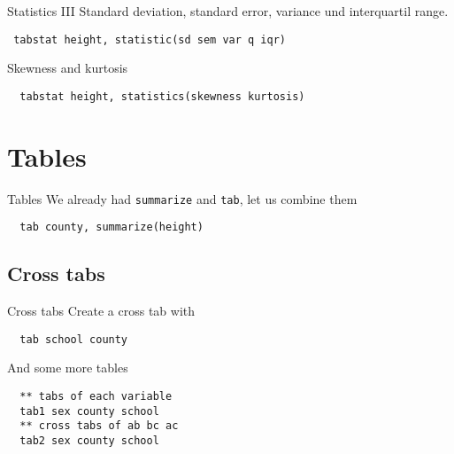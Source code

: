 \begin{frame}[fragile]{Statistics III}
Standard deviation, standard error, variance und interquartil range.              
\begin{lstlisting}
 tabstat height, statistic(sd sem var q iqr)
\end{lstlisting}
Skewness and kurtosis
\begin{lstlisting}
  tabstat height, statistics(skewness kurtosis)
\end{lstlisting}

\end{frame}

\section{Tables}
\begin{frame}[fragile]{Tables}   
We already had \texttt{summarize} and \texttt{tab}, let us combine them
\begin{lstlisting}
  tab county, summarize(height)
\end{lstlisting}
\end{frame}

\subsection{Cross tabs}
\begin{frame}[fragile]{Cross tabs}    
Create a cross tab with
\begin{lstlisting}
  tab school county
\end{lstlisting}
And some more tables
\begin{lstlisting}
  ** tabs of each variable
  tab1 sex county school
  ** cross tabs of ab bc ac
  tab2 sex county school
\end{lstlisting}
\end{frame}

